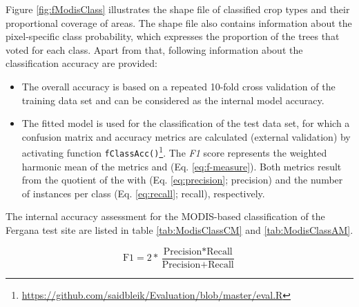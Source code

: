Figure \ref{fig:fModisClass} illustrates the shape file of classified crop types and their  proportional coverage of areas. The shape file also contains information about the pixel-specific class probability, which expresses the proportion of the trees that voted for each class. Apart from that, following information about the classification accuracy are provided:



\begin{itemize}
\item The overall accuracy is based on a repeated 10-fold cross validation of the training data set and can be considered as the internal model accuracy.  
\item The fitted model is used for the classification of the test data set, for which a confusion matrix and accuracy metrics are calculated (external validation) by activating function \texttt{fClassAcc()}\footnote{\url{https://github.com/saidbleik/Evaluation/blob/master/eval.R}}.
The  \textit{F1} score represents the weighted harmonic mean of the metrics  and  (Eq. \eqref{eq:f-measure}). Both metrics result from the quotient of the  with   (Eq. \eqref{eq:precision}; precision) and {the number of instances per class} (Eq. \eqref{eq:recall}; recall), respectively.
\end{itemize}

The internal accuracy assessment for the MODIS-based classification of the Fergana test site are listed in table  \ref{tab:ModisClassCM} and \ref{tab:ModisClassAM}.

\begin{equation}
\label{eq:f-measure}
\text{F1} = 2 * \frac{\text{Precision} * \text{Recall}}{\text{Precision} + \text{Recall}}
\end{equation}

